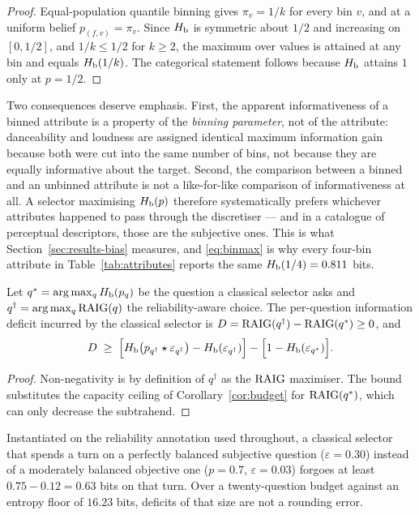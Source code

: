 \begin{proof}
Equal-population quantile binning gives $\pi_v = 1/k$ for every bin $v$, and at
a uniform belief $p_{(f,v)} = \pi_v$. Since $H_{\mathrm{b}}$ is symmetric about $1/2$ and
increasing on $[0,1/2]$, and $1/k \le 1/2$ for $k \ge 2$, the maximum over
values is attained at any bin and equals $H_{\mathrm{b}}(1/k)$. The categorical statement
follows because $H_{\mathrm{b}}$ attains $1$ only at $p=1/2$.
\end{proof}

Two consequences deserve emphasis. First, the apparent informativeness of a
binned attribute is a property of the \emph{binning parameter}, not of the
attribute: danceability and loudness are assigned identical maximum information
gain because both were cut into the same number of bins, not because they are
equally informative about the target. Second, the comparison between a binned
and an unbinned attribute is not a like-for-like comparison of informativeness
at all. A selector maximising $H_{\mathrm{b}}(p)$ therefore systematically prefers
whichever attributes happened to pass through the discretiser --- and in a
catalogue of perceptual descriptors, those are the subjective ones. This is
what Section~\ref{sec:results-bias} measures, and \eqref{eq:binmax} is why
every four-bin attribute in Table~\ref{tab:attributes} reports the same
$H_{\mathrm{b}}(1/4)=0.811$ bits.

\begin{corollary}
\label{cor:deficit}
Let $q^\ast = \arg\max_q H_{\mathrm{b}}(p_q)$ be the question a classical selector asks
and $q^\dagger = \arg\max_q \mathrm{RAIG}(q)$ the reliability-aware choice. The
per-question information deficit incurred by the classical selector is
$D = \mathrm{RAIG}(q^\dagger) - \mathrm{RAIG}(q^\ast) \ge 0$, and
\begin{equation}
D \;\ge\; \Big[H_{\mathrm{b}}\!\left(p_{q^\dagger} \star \varepsilon_{q^\dagger}\right)
- H_{\mathrm{b}}(\varepsilon_{q^\dagger})\Big] - \Big[1 - H_{\mathrm{b}}(\varepsilon_{q^\ast})\Big].
\end{equation}
\end{corollary}

\begin{proof}
Non-negativity is by definition of $q^\dagger$ as the $\mathrm{RAIG}$ maximiser. The
bound substitutes the capacity ceiling of Corollary~\ref{cor:budget} for
$\mathrm{RAIG}(q^\ast)$, which can only decrease the subtrahend.
\end{proof}

Instantiated on the reliability annotation used throughout, a classical
selector that spends a turn on a perfectly balanced subjective question
($\varepsilon = 0.30$) instead of a moderately balanced objective one
($p = 0.7$, $\varepsilon = 0.03$) forgoes at least $0.75 - 0.12 = 0.63$ bits on
that turn. Over a twenty-question budget against an entropy floor of $16.23$
bits, deficits of that size are not a rounding error.


